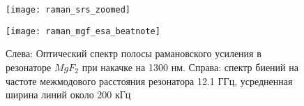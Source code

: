 \begin{figure}[ht]
\begin{minipage}[ht]{0.49\linewidth}\centering
    \texttt{[image: raman\_srs\_zoomed]}
  \end{minipage}
  \hfill
  \begin{minipage}[ht]{0.49\linewidth}\centering
    \texttt{[image: raman\_mgf\_esa\_beatnote]}
  \end{minipage}
    \caption{Слева: Оптический спектр полосы рамановского усиления в резонаторе $MgF_2$ при накачке на 1300 нм. Справа: спектр биений на частоте межмодового расстояния резонатора 12.1 ГГц, усредненная ширина линий около 200 кГц}
  \label{mgf_srs_beatnote}
\end{figure}


